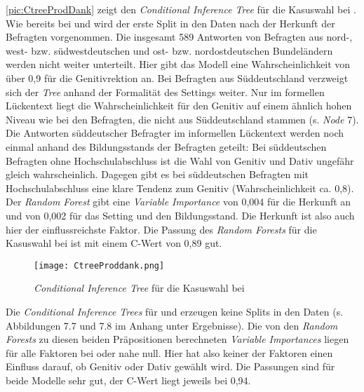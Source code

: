 \autoref{pic:CtreeProdDank} zeigt den \textit{Conditional Inference Tree} für die Kasuswahl bei \dank. 
Wie bereits bei \wegen{} und \waehrend{} wird der erste Split in den Daten nach der Herkunft der Befragten vorgenommen. 
Die insgesamt 589 Antworten von Befragten aus nord-, west- bzw. südwestdeutschen und ost- bzw. nordostdeutschen Bundeländern werden nicht weiter unterteilt. 
Hier gibt das Modell eine Wahrscheinlichkeit von über 0,9 für die Genitivrektion an. 
Bei Befragten aus Süddeutschland verzweigt sich der \textit{Tree} anhand der Formalität des Settings weiter.
Nur im formellen Lückentext liegt die Wahrscheinlichkeit für den Genitiv auf einem ähnlich hohen Niveau wie bei den Befragten, die nicht aus Süddeutschland stammen (s. \textit{Node} 7).
Die Antworten süddeutscher Befragter im informellen Lückentext werden noch einmal anhand des Bildungsstands der Befragten geteilt:
Bei süddeutschen Befragten ohne Hochschulabschluss ist die Wahl von Genitiv und Dativ ungefähr gleich wahrscheinlich. 
Dagegen gibt es bei süddeutschen Befragten mit Hochschulabschluss eine klare Tendenz zum Genitiv (Wahrscheinlichkeit ca. 0,8). 
Der \textit{Random Forest} gibt eine \textit{Variable Importance} von 0,004 für die Herkunft an und von 0,002 für das Setting und den Bildungsstand. 
Die Herkunft ist also auch hier der einflussreichste Faktor. 
Die Passung des \textit{Random Forests} für die Kasuswahl bei \dank{} ist mit einem C-Wert von 0,89 gut. 

\begin{figure}
\centering
\texttt{[image: CtreeProddank.png]}
\caption{\textit{Conditional Inference Tree} für die Kasuswahl bei \dank}
\label{pic:CtreeProdDank}
\end{figure}

Die \textit{Conditional Inference Trees} für \gegenueber{} und  erzeugen keine Splits in den Daten (s. Abbildungen 7.7 und 7.8 im Anhang unter Ergebnisse). 
Die von den \textit{Random Forests} zu diesen beiden Präpositionen berechneten \textit{Variable Importances} liegen für alle Faktoren bei oder nahe null.
Hier hat also keiner der Faktoren einen Einfluss darauf, ob Genitiv oder Dativ gewählt wird. 
Die Passungen sind für beide Modelle sehr gut, der C-Wert liegt jeweils bei 0,94. 
%


